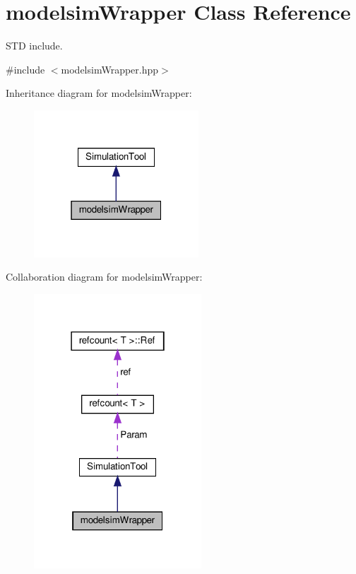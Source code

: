 \hypertarget{classmodelsimWrapper}{}\section{modelsim\+Wrapper Class Reference}
\label{classmodelsimWrapper}


S\+TD include.  




{\ttfamily \#include $<$modelsim\+Wrapper.\+hpp$>$}



Inheritance diagram for modelsim\+Wrapper\+:
\nopagebreak
\begin{figure}[H]
\begin{center}
\leavevmode
\includegraphics[width=175pt]{da/d2c/classmodelsimWrapper__inherit__graph}
\end{center}
\end{figure}


Collaboration diagram for modelsim\+Wrapper\+:
\nopagebreak
\begin{figure}[H]
\begin{center}
\leavevmode
\includegraphics[width=178pt]{d9/dc8/classmodelsimWrapper__coll__graph}
\end{center}
\end{figure}
